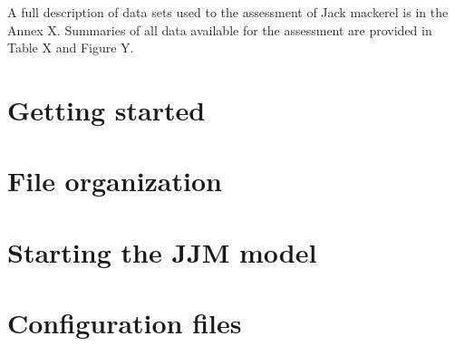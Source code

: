 \documentclass{article}
\begin{document}
A full description of data sets used to the assessment of Jack mackerel is in the Annex X. Summaries of all data available for the assessment are provided in Table X and Figure Y.

\section{Getting started} 

\section{File organization}

\section{Starting the JJM model}

\section{Configuration files}
\end{document}
